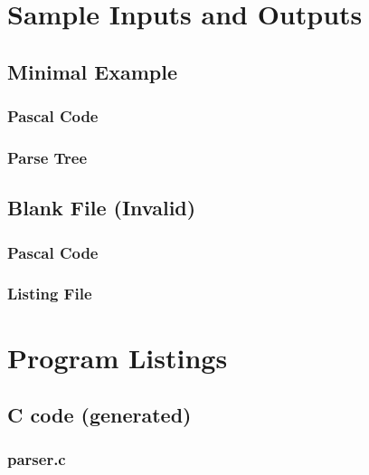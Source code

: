 \documentclass[titlepage]{article}
\begin{document}
	\section{Sample Inputs and Outputs}
		\subsection{Minimal Example}
			\begin{minipage}[t]{0.5\textwidth}
				\subsubsection{Pascal Code}
				
			\end{minipage}
			\begin{minipage}[t]{0.5\textwidth}
				\subsubsection{Parse Tree}
				
			\end{minipage}
		\subsection{Blank File (Invalid)}
			\begin{minipage}[t]{0.5\textwidth}
				\subsubsection{Pascal Code}
				
			\end{minipage}
			\begin{minipage}[t]{0.5\textwidth}
				\subsubsection{Listing File}
				
			\end{minipage}
	\section{Program Listings}
		\ifdefined{}
		\subsection{C code (generated)}
			\subsubsection{parser.c}
			
\end{document}
